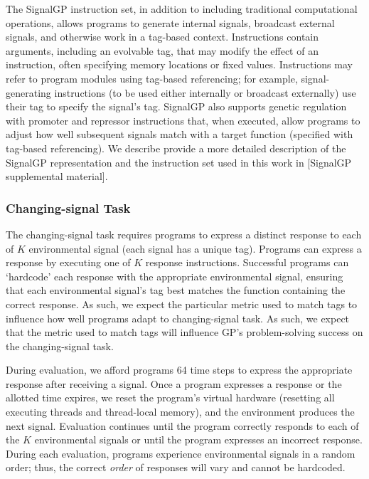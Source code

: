 The SignalGP instruction set, in addition to including traditional computational operations, allows programs to generate internal signals, broadcast external signals, and otherwise work in a tag-based context.
Instructions contain arguments, including an evolvable tag, that may modify the effect of an instruction, often specifying memory locations or fixed values.
Instructions may refer to program modules using tag-based referencing; for example, signal-generating instructions (to be used either internally or broadcast externally) use their tag to specify the signal's tag.
SignalGP also supports genetic regulation with promoter and repressor instructions that, when executed, allow programs to adjust how well subsequent signals match with a target function (specified with tag-based referencing).
We describe provide a more detailed description of the SignalGP representation and the instruction set used in this work in [SignalGP supplemental material].

\subsubsection{Changing-signal Task}

The changing-signal task requires programs to express a distinct response
to each of $K$ environmental signal (each signal has a unique tag).
Programs can express a response by executing one of $K$ response instructions.
Successful programs can `hardcode' each response with the appropriate environmental signal, ensuring that each environmental signal's tag best matches the function containing the correct response.
As such, we expect the particular metric used to match tags to influence how well programs adapt to changing-signal task.
As such, we expect that the metric used to match tags will influence GP's problem-solving success on the changing-signal task.

During evaluation, we afford programs 64 time steps to express the appropriate response after receiving a signal.
Once a program expresses a response or the allotted time expires, we reset the program's virtual hardware (resetting all executing threads and thread-local memory), and the environment produces the next signal.
Evaluation continues until the program correctly responds to each of the $K$ environmental signals or until the program expresses an incorrect response.
During each evaluation, programs experience environmental signals in a random order; thus, the correct \textit{order} of responses will vary and cannot be hardcoded.

